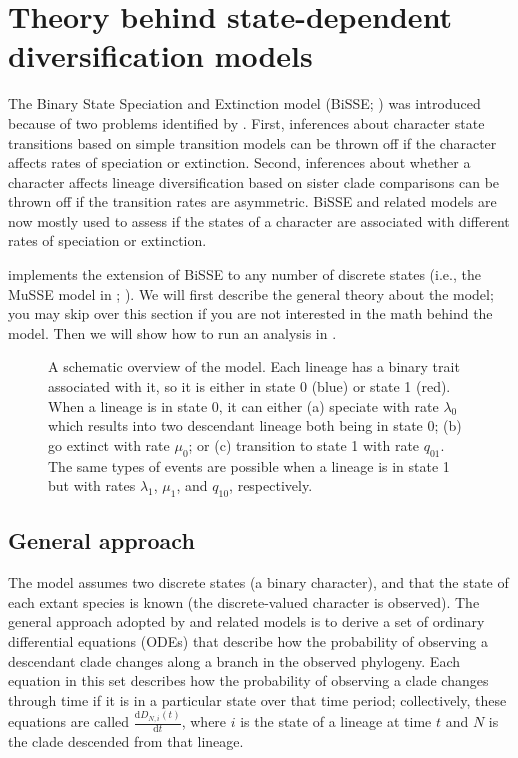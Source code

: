 \section{Theory behind state-dependent diversification models} \label{sec:BiSSE_Theory}

The Binary State Speciation and Extinction model (BiSSE; \citealt{Maddison2007}) was introduced because of two problems identified by \citet{Maddison2006b}.
First, inferences about character state transitions based on simple transition models \citep[like][]{Pagel1999} can be thrown off if the character affects rates of speciation or extinction.
Second, inferences about whether a character affects lineage diversification based on sister clade comparisons \citep{Mitter1988} can be thrown off if the transition rates are asymmetric.
BiSSE and related models are now mostly used to assess if the states of a character are associated with different rates of speciation or extinction.

\RevBayes implements the extension of BiSSE to any number of discrete states (i.e., the MuSSE model in \diversitree; \citealt{FitzJohn2012}).
We will first describe the general theory about the model;
you may skip over this section if you are not interested in the math behind the model.
Then we will show how to run an analysis in \RevBayes.

\begin{figure}[h!]
\centering
{}
\caption{\small
    A schematic overview of the \BiSSE model.
    Each lineage has a binary trait associated with it, so it is either in state 0 (blue) or state 1 (red).
    When a lineage is in state 0, it can either (a) speciate with rate $\lambda_0$ which results into two descendant lineage both being in state 0; (b) go extinct with rate $\mu_0$; or (c) transition to state 1 with rate $q_{01}$.
    The same types of events are possible when a lineage is in state 1 but with rates $\lambda_1$, $\mu_1$, and $q_{10}$, respectively.
}
\label{fig:BiSSE_Schematic}
\end{figure}

\subsection{General approach}

The \BiSSE model assumes two discrete states (\IE a binary character), and that the state of each extant species is known (\IE the discrete-valued character is observed).
The general approach adopted by \BiSSE and related models is to derive a set of ordinary differential equations (ODEs) that describe how the probability of observing a descendant clade changes along a branch in the observed phylogeny.
Each equation in this set describes how the probability of observing a clade changes through time if it is in a particular state over that time period; collectively, these equations are called $\frac{ \mathrm{d}D_{N,i}(t)}{\mathrm{d}t}$, where $i$ is the state of a lineage at time $t$ and $N$ is the clade descended from that lineage.

